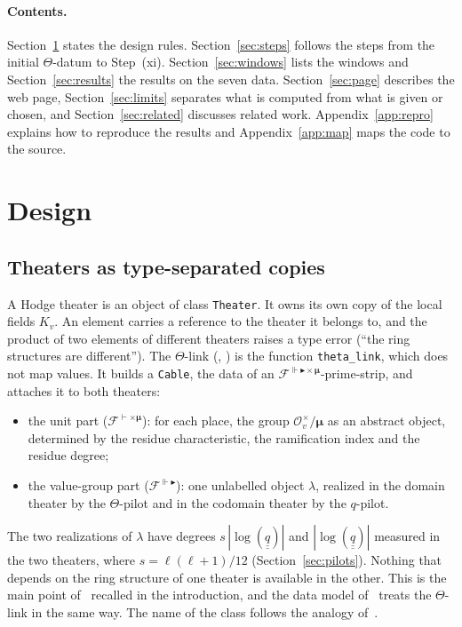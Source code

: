 \documentclass[11pt,a4paper]{article}
\newcommand{\qq}{\underline{\underline{q}}{}}
\newcommand{\cO}{\mathcal{O}}
\newcommand{\code}[1]{\texttt{#1}}
\begin{document}
\paragraph{Contents.} Section~\ref{sec:design} states the design rules. Section~\ref{sec:steps} follows the
steps from the initial $\Theta$-datum to Step~(xi). Section~\ref{sec:windows} lists the windows and
Section~\ref{sec:results} the results on the seven data. Section~\ref{sec:page} describes the web page,
Section~\ref{sec:limits} separates what is computed from what is given or chosen, and
Section~\ref{sec:related} discusses related work. Appendix~\ref{app:repro} explains how to reproduce the
results and Appendix~\ref{app:map} maps the code to the source.

\section{Design}\label{sec:design}

\subsection{Theaters as type-separated copies}\label{sec:theaters}
A Hodge theater is an object of class \code{Theater}. It owns its own copy of the local fields $K_v$. An element
carries a reference to the theater it belongs to, and the product of two elements of different theaters raises a
type error (``the ring structures are different''). The $\Theta$-link (\cite[Cor.~3.7]{IUT1},
\cite[Def.~3.8]{IUT3}) is the function \code{theta\_link}, which does not map values. It builds a \code{Cable},
the data of an $\mathcal{F}^{\Vdash\blacktriangleright\times\boldsymbol\mu}$-prime-strip, and attaches it to both
theaters:
\begin{itemize}
\item the unit part ($\mathcal{F}^{\vdash\times\boldsymbol\mu}$): for each place, the group
  $\cO_v^\times/\boldsymbol\mu$ as an abstract object, determined by the residue characteristic, the
  ramification index and the residue degree;
\item the value-group part ($\mathcal{F}^{\Vdash\blacktriangleright}$): one unlabelled object $\lambda$,
  realized in the domain theater by the $\Theta$-pilot and in the codomain theater by the $q$-pilot.
\end{itemize}
The two realizations of $\lambda$ have degrees $s\,|\log(\qq)|$ and $|\log(\qq)|$ measured in the two theaters,
where $s=\ell(\ell+1)/12$ (Section~\ref{sec:pilots}). Nothing that depends on the ring structure of one theater is
available in the other. This is the main point of~\cite[\S3]{Formal} recalled in the introduction, and the data
model of~\cite{Richards} treats the $\Theta$-link in the same way. The name of the class follows the analogy
of~\cite[Rem.~3.11.1(iv)]{IUT3}.
\end{document}
